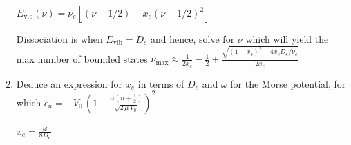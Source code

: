 \documentclass{article}
\begin{document}
\begin{enumerate}
  {\color{blue}
  $E_{\text{vib}}(\nu) = \nu_e[(\nu +1/2) - x_e(\nu+1/2)^2]$

  Dissociation is when $E_{\text{vib}} = D_e$ and hence, solve for $\nu$ which
  will yield the max number of bounded states
  $\nu_{\text{max}} \approx \frac{1}{2x_e} - \frac{1}{2} + 
  \frac{\sqrt{(1-x_e)^2-4x_eD_e/\nu_e}}{2x_e}$}
  
\item Deduce an expression for $x_e$ in terms of $D_e$ and $\omega$
for the Morse potential, for which 
$
\epsilon_n = -V_0\, \left( 1 - \frac{\alpha (n+\frac{1}{2})}{\sqrt{2\, \mu\, V_0}} \right)^2
$

{\color{blue}
$x_e = \frac{\omega}{8 D_e}$}
\end{enumerate}
  
  
  
\end{document}
